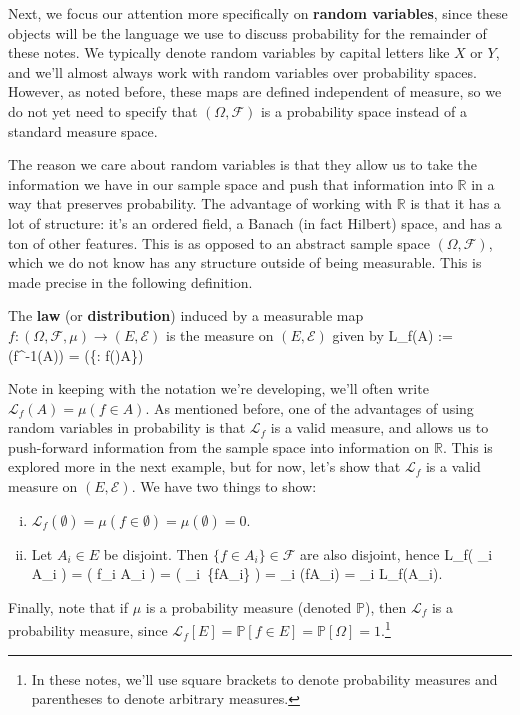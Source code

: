Next, we focus our attention more specifically on \textbf{random variables}, since these objects will be the language we use to discuss probability for the remainder of these notes. We typically denote random variables by capital letters like $X$ or $Y$, and we'll almost always work with random variables over probability spaces. However, as noted before, these maps are defined independent of measure, so we do not yet need to specify that $(\Omega, \mathcal F)$ is a probability space instead of a standard measure space. 

The reason we care about random variables is that they allow us to take the information we have in our sample space and push that information into $\mathbb R$ in a way that preserves probability. The advantage of working with $\mathbb R$ is that it has a lot of structure: it's an ordered field, a Banach (in fact Hilbert) space, and has a ton of other features. This is as opposed to an abstract sample space $(\Omega, \mathcal F)$, which we do not know has any structure outside of being measurable. This is made precise in the following definition.
\begin{definition}
	The \textbf{law} (or \textbf{distribution}) induced by a measurable map $f : (\Omega, \mathcal F, \mu)\rightarrow (E, \mathcal E)$ is the measure on $(E, \mathcal E)$ given by
	\eq
		\mathcal L_f(A) := \mu(f^{-1}(A)) = \mu(\{\omega\in\Omega : f(\omega)\in A\})
	\qe
\end{definition}

Note in keeping with the notation we're developing, we'll often write $\mathcal L_f(A) = \mu(f\in A)$. As mentioned before, one of the advantages of using random variables in probability is that $\mathcal L_f$ is a valid measure, and allows us to push-forward information from the sample space into information on $\mathbb R$. This is explored more in the next example, but for now, let's show that $\mathcal L_f$ is a valid measure on $(E, \mathcal E)$. We have two things to show:
\begin{enumerate}[i)]
	\item $\mathcal L_f(\emptyset) = \mu(f\in\emptyset) = \mu(\emptyset) = 0$. 
	\item Let $A_i\in E$ be disjoint. Then $\{f\in A_i\}\in \mathcal F$ are also disjoint, hence
	\eq
		\mathcal L_f\left( \bigsqcup_i A_i \right) = \mu\left( f\in \bigsqcup_i A_i \right) = \mu\left( \bigsqcup_i \,\{f\in A_i\} \right) = \sum_i \mu(f\in A_i) = \sum_i \mathcal L_f(A_i).
	\qe
\end{enumerate}
Finally, note that if $\mu$ is a probability measure (denoted $\mathbb P$), then $\mathcal L_f$ is a probability measure, since $\mathcal L_f[E] = \mathbb P[f\in E] = \mathbb P[\Omega] = 1$.\footnote{In these notes, we'll use square brackets to denote probability measures and parentheses to denote arbitrary measures.}

